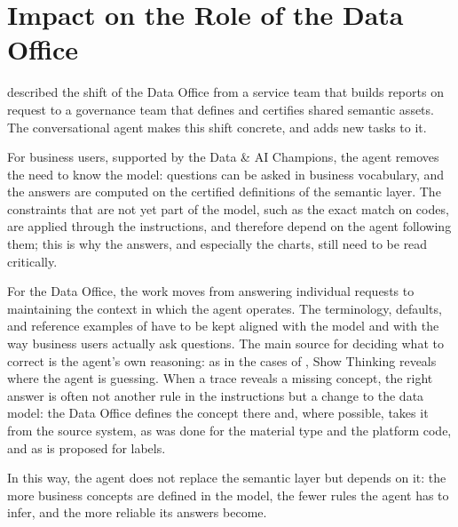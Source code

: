 \section[Impact on the Data Office]{Impact on the Role of the Data Office}
\label{sec:data_office_transformation}

 described the shift of the Data Office from a service team that builds reports on request to a governance team that defines and certifies shared semantic assets. The conversational agent makes this shift concrete, and adds new tasks to it.

For business users, supported by the Data \& AI Champions, the agent removes the need to know the model: questions can be asked in business vocabulary, and the answers are computed on the certified definitions of the semantic layer. The constraints that are not yet part of the model, such as the exact match on codes, are applied through the instructions, and therefore depend on the agent following them; this is why the answers, and especially the charts, still need to be read critically.

For the Data Office, the work moves from answering individual requests to maintaining the context in which the agent operates. The terminology, defaults, and reference examples of  have to be kept aligned with the model and with the way business users actually ask questions. The main source for deciding what to correct is the agent's own reasoning: as in the cases of , Show Thinking reveals where the agent is guessing. When a trace reveals a missing concept, the right answer is often not another rule in the instructions but a change to the data model: the Data Office defines the concept there and, where possible, takes it from the source system, as was done for the material type and the platform code, and as is proposed for labels.

In this way, the agent does not replace the semantic layer but depends on it: the more business concepts are defined in the model, the fewer rules the agent has to infer, and the more reliable its answers become.
